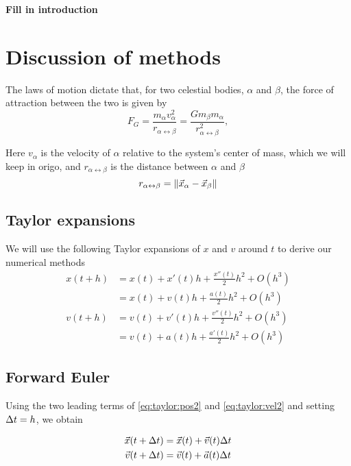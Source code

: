\documentclass[a4paper]{article}
\begin{document}
\textbf{Fill in introduction}




\section{Discussion of methods}\label{sec:methods}
The laws of motion dictate that, for two celestial bodies, $\alpha$ and $\beta$, the force of attraction between the two is given by
\begin{equation}
F_G= \frac{m_{\alpha}v_{\alpha}^2}{r_{\alpha \leftrightarrow \beta}}
=\frac{Gm_{\beta}m_{\alpha}}{r_{\alpha \leftrightarrow \beta}^2},
\end{equation}

Here $v_{\alpha}$ is the velocity of $\alpha$ relative to the system's center of mass, which we will keep in origo, and $r_{\alpha \leftrightarrow \beta}$ is the distance between $\alpha$ and $\beta$
\begin{equation}
r_{\alpha \leftrightarrow \beta} = \norm{ \vec{x}_{\alpha} - \vec{x}_{\beta} }
\end{equation}

\subsection{Taylor expansions}
We will use the following Taylor expansions of $x$ and $v$ around $t$ to derive our numerical methods
\begin{align}
    x(t + h) &= x(t) + x'(t) h + \frac{x''(t)}{2} h^2 + O(h^3) \label{eq:taylor:pos1}\\
    &= x(t) + v(t) h + \frac{a(t)}{2} h^2 + O(h^3) \label{eq:taylor:pos2} \\
    v(t + h) &= v(t) + v'(t) h + \frac{v''(t)}{2} h^2 + O(h^3) \label{eq:taylor:vel1} \\
    &= v(t) + a(t) h + \frac{a'(t)}{2} h^2 + O(h^3) \label{eq:taylor:vel2}
\end{align}

\subsection{Forward Euler}
Using the two leading terms of \eqref{eq:taylor:pos2} and \eqref{eq:taylor:vel2} and setting ${\Delta t} = h$, we obtain

\begin{align}
    \vec{x}(t + {\Delta t}) &= \vec{x}(t) + \vec{v}(t){\Delta t}  \label{eq:forwardeuler:pos} \\
    \vec{v}(t + {\Delta t}) &= \vec{v}(t) + \vec{a}(t){\Delta t} \label{eq:forwardeuler:vel}
\end{align}
\end{document}
